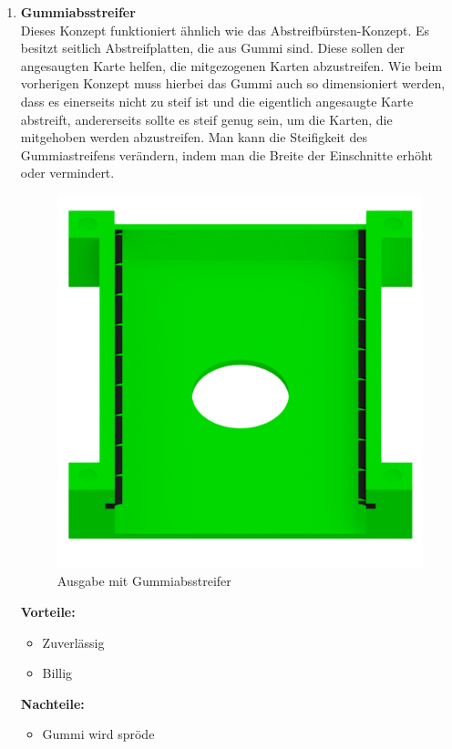 \begin{enumerate}
    \item \textbf{Gummiabsstreifer}\\
    Dieses Konzept funktioniert ähnlich wie das Abstreifbürsten-Konzept.
    Es besitzt seitlich Abstreifplatten, die aus Gummi sind.
    Diese sollen der angesaugten Karte helfen, die mitgezogenen Karten abzustreifen.
    Wie beim vorherigen Konzept muss hierbei das Gummi auch so
    dimensioniert werden, dass es einerseits nicht zu steif ist und die eigentlich angesaugte Karte abstreift, andererseits sollte es steif genug sein, um die Karten, die mitgehoben werden abzustreifen.
    Man kann die Steifigkeit des Gummiastreifens verändern, indem man die Breite der Einschnitte
    erhöht oder vermindert.

    \begin{figure}[H]
        \centering
        \includegraphics[scale=0.3,page=1]{fig/mech/AsugabeMitGummiabstreifer.png}
        \caption{Ausgabe mit Gummiabsstreifer}
    \end{figure}

    \textbf{Vorteile:}
    \begin{itemize}
        \item Zuverlässig
        \item Billig
    \end{itemize}
    \textbf{Nachteile:}
    \begin{itemize}
        \item Gummi wird spröde
    \end{itemize}
\end{enumerate}


